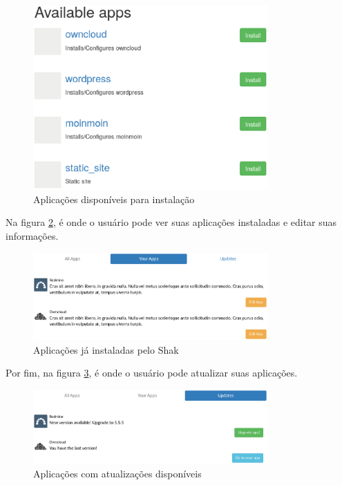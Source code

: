 \begin{anexosenv}
\begin{figure}[H]
  \centering
  \includegraphics[width=0.8\textwidth]
      {figuras/shak1-2}
      \caption{Aplicações disponíveis para instalação}
  \label{fig:shakx1.2}
\end{figure}

Na figura \ref{fig:shakx2}, é onde o usuário pode ver suas aplicações instaladas e editar
suas informações.

\begin{figure}[H]
  \centering
  \includegraphics[width=0.8\textwidth]
      {figuras/shak2}
      \caption{Aplicações já instaladas pelo Shak}
  \label{fig:shakx2}
\end{figure}

Por fim, na figura \ref{fig:shakx3}, é onde o usuário pode atualizar suas aplicações.

\begin{figure}[H]
  \centering
  \includegraphics[width=0.8\textwidth]
      {figuras/shak3}
      \caption{Aplicações com atualizações disponíveis}
  \label{fig:shakx3}
\end{figure}

\end{anexosenv}
